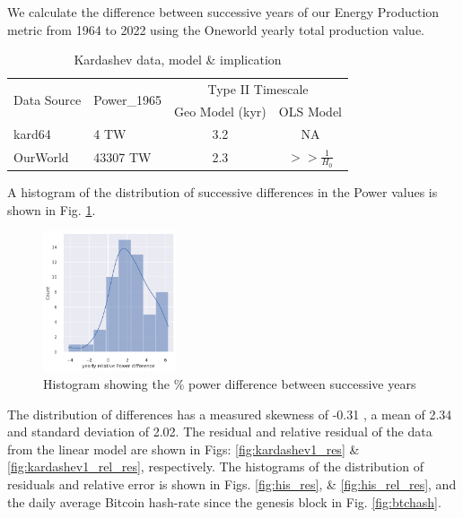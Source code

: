 \documentclass[final,5p,times,twocolumn,authoryear]{elsarticle}
\begin{document}
We calculate the difference between successive years of our Energy Production metric from 1964 to 2022 using the Oneworld yearly total production value. 


\begin{table}[h]
\centering
\caption{Kardashev data, model \& implication}
\label{kard_comp}
\begin{tabular}{|l|l|c|c|}
\hline
\multirow{2}{*}{Data Source} & \multirow{2}{*}{\textrm{Power\_{1965}}} & \multicolumn{2}{c|}{Type II Timescale} \\
\cline{3-4}
                             &                       & Geo Model (kyr) & OLS Model         \\
\hline
kard64 \cite{kar64} & 4 TW                & 3.2             & NA          \\
\hline
OurWorld \cite{owidenergy}    & 43307 TW               & 2.3             & $>> \frac{1}{H_{0}}$     \\
\hline
\end{tabular}
\end{table}


A histogram of the distribution of successive differences in the Power values is shown in Fig. \ref{fig:his_power}. 

\begin{figure}
    \centering
    \includegraphics[width=0.35\textwidth]{figs/pp_his_kdetrue.png}
    \vspace*{-0.3cm}
    \caption{Histogram showing the \% power difference between successive years}
    \label{fig:his_power}
\end{figure}

The distribution of differences has a measured skewness of -0.31 \cite{zw00}, a mean of 2.34 and standard deviation of 2.02. The residual and relative residual of the data from the linear model are shown in Figs: \ref{fig:kardashev1_res} \& \ref{fig:kardashev1_rel_res}, respectively. The histograms of the distribution of residuals and relative error is shown in Figs. \ref{fig:his_res}, \& \ref{fig:his_rel_res}, and the daily average Bitcoin hash-rate since the genesis block in Fig. \ref{fig:btchash}.
\end{document}
